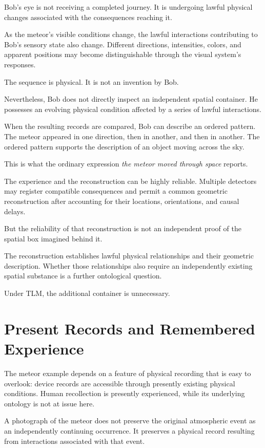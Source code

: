 \documentclass[12pt,onecolumn]{article}
\begin{document}
Bob's eye is not receiving a completed journey. It is undergoing lawful physical changes associated with the consequences reaching it.

As the meteor's visible conditions change, the lawful interactions contributing to Bob's sensory state also change. Different directions, intensities, colors, and apparent positions may become distinguishable through the visual system's responses.

The sequence is physical. It is not an invention by Bob.

Nevertheless, Bob does not directly inspect an independent spatial container. He possesses an evolving physical condition affected by a series of lawful interactions.

When the resulting records are compared, Bob can describe an ordered pattern. The meteor appeared in one direction, then in another, and then in another. The ordered pattern supports the description of an object moving across the sky.

This is what the ordinary expression \emph{the meteor moved through space} reports.

The experience and the reconstruction can be highly reliable. Multiple detectors may register compatible consequences and permit a common geometric reconstruction after accounting for their locations, orientations, and causal delays.

But the reliability of that reconstruction is not an independent proof of the spatial box imagined behind it.

The reconstruction establishes lawful physical relationships and their geometric description. Whether those relationships also require an independently existing spatial substance is a further ontological question.

Under TLM, the additional container is unnecessary.

\section{Present Records and Remembered Experience}

The meteor example depends on a feature of physical recording that is easy to overlook: device records are accessible through presently existing physical conditions. Human recollection is presently experienced, while its underlying ontology is not at issue here.

A photograph of the meteor does not preserve the original atmospheric event as an independently continuing occurrence. It preserves a physical record resulting from interactions associated with that event.
\end{document}

